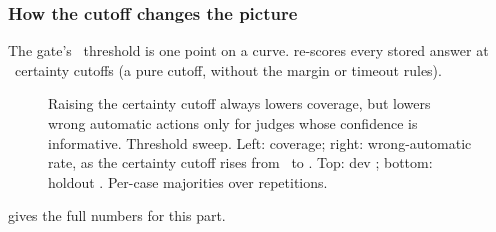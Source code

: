 \subsubsection{How the cutoff changes the picture}

The gate's \MinP\ threshold is one point on a curve.  re-scores every stored answer at
\NumCutoffs\ certainty cutoffs (a pure cutoff, without the margin or timeout rules).

\begin{figure}[tbp]
\centering

\caption{Raising the certainty cutoff always lowers coverage, but lowers wrong automatic actions only for judges whose confidence is informative. Threshold sweep. Left: coverage; right: wrong-automatic rate, as the certainty cutoff rises from
\SweepMin\ to \SweepMax. Top: dev \screen; bottom: holdout \prereg. Per-case majorities over repetitions.}
\label{jb:fig:sweep}
\end{figure}

 gives the full numbers for this part.

\begin{table}[tbp]
\centering\small
\caption{Automatic / wrong automatic decisions at selected cutoffs, holdout \prereg\ (out of \HoldN).}
\label{jb:tab:threshold}

\end{table}
